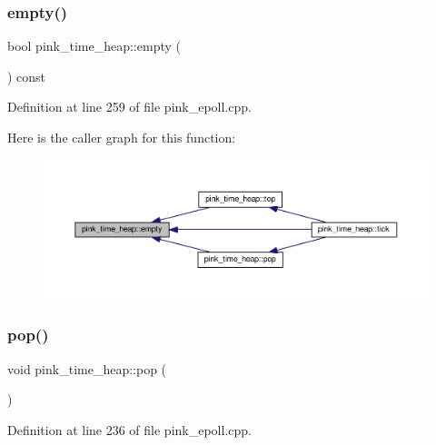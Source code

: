 \subsubsection{\texorpdfstring{empty()}{empty()}}
{\footnotesize\ttfamily bool pink\+\_\+time\+\_\+heap\+::empty (\begin{DoxyParamCaption}{ }\end{DoxyParamCaption}) const}



Definition at line 259 of file pink\+\_\+epoll.\+cpp.

Here is the caller graph for this function\+:\nopagebreak
\begin{figure}[H]
\begin{center}
\leavevmode
\includegraphics[width=350pt]{classpink__time__heap_ade64cf32193747380cb57c5709e28383_icgraph}
\end{center}
\end{figure}
\mbox{\label{classpink__time__heap_a5642ee3340cdee7983ed63770e7109d1}} 
\subsubsection{\texorpdfstring{pop()}{pop()}}
{\footnotesize\ttfamily void pink\+\_\+time\+\_\+heap\+::pop (\begin{DoxyParamCaption}{ }\end{DoxyParamCaption})}



Definition at line 236 of file pink\+\_\+epoll.\+cpp.


